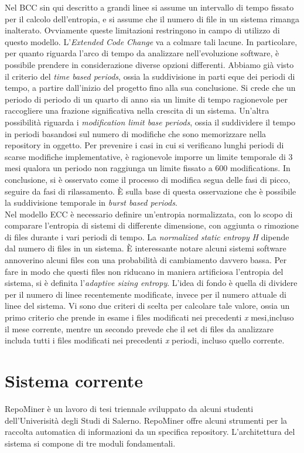 Nel BCC sin qui descritto a grandi linee si assume un intervallo di tempo fissato per il calcolo dell'entropia, e si assume che il numero di file in un sistema rimanga inalterato. Ovviamente queste limitazioni restringono in campo di utilizzo di questo modello. L'\textit{Extended Code Change} va a colmare tali lacune. In particolare, per quanto riguarda l'arco di tempo da analizzare nell'evoluzione software, è possibile prendere in considerazione diverse opzioni differenti. Abbiamo già visto il criterio del \textit{time based periods}, ossia la suddivisione in parti eque dei periodi di tempo, a partire dall'inizio del progetto fino alla sua conclusione. Si crede che un periodo di periodo di un quarto di anno sia un limite di tempo ragionevole per raccogliere una frazione significativa nella crescita di un sistema. Un'altra possibilità riguarda i \textit{modification limit base periods}, ossia il suddividere il tempo in periodi basandosi sul numero di modifiche che sono memorizzare nella repository in oggetto. Per prevenire i casi in cui si verificano lunghi periodi di scarse modifiche implementative, è ragionevole imporre un limite temporale di 3 mesi qualora un periodo non raggiunga un limite fissato a 600 modifications. In conclusione, si è osservato come il processo di modifica segua delle fasi di picco, seguire da fasi di rilassamento. È sulla base di questa osservazione che è possibile la suddivisione temporale in \textit{burst based periods}.\\

Nel modello ECC è necessario definire un'entropia normalizzata, con lo scopo di comparare l'entropia di sistemi di differente dimensione, con aggiunta o rimozione di files durante i vari periodi di tempo. La \textit{normalized static entropy} \textit{H} dipende dal numero di files in un sistema. È interessante notare alcuni sistemi software annoverino alcuni files con una probabilità di cambiamento davvero bassa. Per fare in modo che questi files non riducano in maniera artificiosa l'entropia del sistema, si è definita l'\textit{adaptive sizing entropy}. L'idea di fondo è quella di dividere per il numero di linee recentemente modificate, invece per il numero attuale di linee del sistema. Vi sono due criteri di scelta per calcolare tale valore, ossia un primo criterio che prende in esame i files modificati nei precedenti \textit{x} mesi,incluso il mese corrente, mentre un secondo prevede che il set di files da analizzare includa tutti i files modificati nei precedenti \textit{x} periodi, incluso quello corrente. 
\section{Sistema corrente}
RepoMiner è un lavoro di tesi triennale sviluppato da alcuni studenti dell'Univerisità degli Studi di Salerno. RepoMiner offre alcuni strumenti per la raccolta automatica di informazioni da un specifica repository. L'architettura del sistema si compone di tre moduli fondamentali. \\

